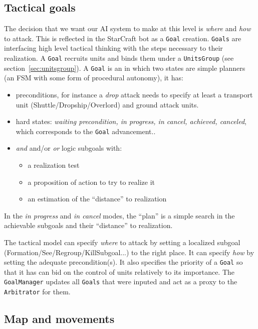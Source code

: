 \subsection{Tactical goals}
\label{sec:goals}
The decision that we want our AI system to make at this level is \textit{where} and \textit{how} to attack. This is reflected in the StarCraft bot as a \texttt{Goal} creation. \texttt{Goals} are interfacing high level tactical thinking with the steps necessary to their realization. A \texttt{Goal} recruits units and binds them under a \texttt{UnitsGroup} (see section~\ref{sec:unitsgroup}). A \texttt{Goal} is an  in which two states are simple planners (an FSM with some form of procedural autonomy), it has:
\begin{itemize}
    \item preconditions, for instance a \textit{drop} attack needs to specify at least a transport unit (Shuttle/Dropship/Overlord) and ground attack units.
    \item hard states: \textit{waiting precondition, in progress, in cancel, achieved, canceled}, which corresponds to the \texttt{Goal} advancement..
    \item \textit{and} and/or \textit{or} logic subgoals with:
        \begin{itemize}
            \item a realization test
            \item a proposition of action to try to realize it
            \item an estimation of the ``distance'' to realization
        \end{itemize}
\end{itemize}
In the \textit{in progress} and \textit{in cancel} modes, the ``plan'' is a simple search in the achievable subgoals and their ``distance'' to realization.

The tactical model can specify \textit{where} to attack by setting a localized subgoal (Formation/See/Regroup/KillSubgoal...) to the right place. It can specify \textit{how} by setting the adequate precondition(s). It also specifies the priority of a \texttt{Goal} so that it has can bid on the control of units relatively to its importance. The \texttt{GoalManager} updates all \texttt{Goals} that were inputed and act as a proxy to the \texttt{Arbitrator} for them.

\subsection{Map and movements}

